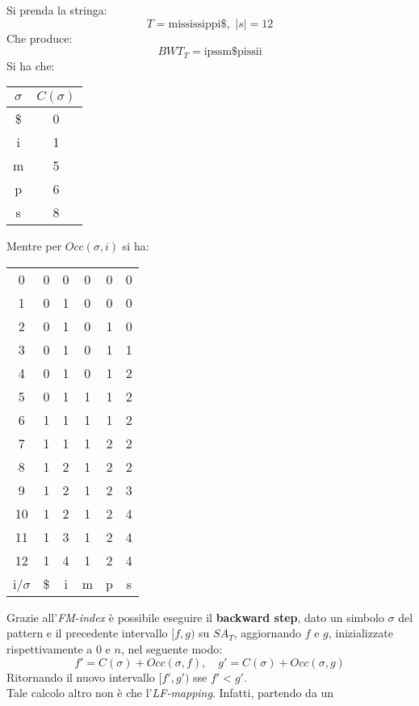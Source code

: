 \begin{esempio}
  Si prenda la stringa:
  \[T=\mbox{mississippi\$},\,\,|s|=12\]
  Che produce:
  \[BWT_T=\mbox{ipssm\$pissii}\]
  Si ha che:
  \begin{table}[H]
    \centering
    \begin{tabular}{c|c}
      $\sigma$ & $C(\sigma)$\\
      \hline
      \hline
      \$ & 0\\
      i & 1 \\
      m & 5\\
      p & 6\\
      s & 8\\
    \end{tabular}
  \end{table}
  Mentre per $Occ(\sigma, i)$ si ha:
  \begin{table}[H]
    \centering
    \begin{tabular}{c|c|c|c|c|c}
      0 & 0 & 0 & 0 & 0 & 0 \\
      1 & 0 & 1 & 0 & 0 & 0 \\
      2 & 0 & 1 & 0 & 1 & 0 \\
      3 & 0 & 1 & 0 & 1 & 1 \\
      4 & 0 & 1 & 0 & 1 & 2 \\
      5 & 0 & 1 & 1 & 1 & 2 \\
      6 & 1 & 1 & 1 & 1 & 2 \\
      7 & 1 & 1 & 1 & 2 & 2 \\
      8 & 1 & 2 & 1 & 2 & 2 \\
      9 & 1 & 2 & 1 & 2 & 3 \\
      10 & 1 & 2 & 1 & 2 & 4 \\
      11 & 1 & 3 & 1 & 2 & 4 \\
      12 & 1 & 4 & 1 & 2 & 4 \\
      \hline
      \hline
      i/$\sigma$ & \$ & i & m & p & s
    \end{tabular}
  \end{table}
\end{esempio}
Grazie all'\textit{FM-index} è possibile eseguire il \textbf{backward step},
dato un simbolo $\sigma$ del pattern e il precedente intervallo $[f,g)$ su
$SA_T$, aggiornando $f$ e $g$, inizializzate rispettivamente a 0 e $n$, nel 
seguente modo: 
\[f'=C(\sigma)+Occ(\sigma, f),\quad g'=C(\sigma)+Occ(\sigma, g)\]
Ritornando il nuovo intervallo $[f', g')$ sse $f'< g'$.\\
Tale calcolo altro non è che l'\textit{LF-mapping}. Infatti, partendo da un
